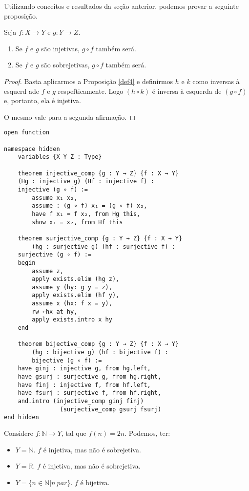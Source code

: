 Utilizando conceitos e resultados da seção anterior, podemos provar a seguinte proposição.

\begin{theorem}
    Seja $f: X \to Y$ e $g: Y \to Z$.
    \renewcommand{\labelenumi}{\Roman{enumi}}
    \begin{enumerate}
        \item Se $f$ e $g$ são injetivas, $g \circ f$ também será.
        \item Se $f$ e $g$ são sobrejetivas, $g \circ f$ também será.
    \end{enumerate}
\end{theorem}

\begin{proof}
    Basta aplicarmos a Proposição \ref{def4} e definirmos $h$ e $k$ como
    inversas à esquerd ade $f$ e $g$ respefticamente. Logo $(h \circ k)$
    é inversa à esquerda de  $(g \circ f)$ e, portanto, ela é injetiva.

    O mesmo vale para a segunda afirmação.
\end{proof}

\begin{lstlisting}
open function

namespace hidden
    variables {X Y Z : Type}

    theorem injective_comp {g : Y → Z} {f : X → Y}
    (Hg : injective g) (Hf : injective f) :
    injective (g ∘ f) :=
        assume x₁ x₂,
        assume : (g ∘ f) x₁ = (g ∘ f) x₂,
        have f x₁ = f x₂, from Hg this,
        show x₁ = x₂, from Hf this

    theorem surjective_comp {g : Y → Z} {f : X → Y}
        (hg : surjective g) (hf : surjective f) :
    surjective (g ∘ f) :=
    begin
        assume z,
        apply exists.elim (hg z),
        assume y (hy: g y = z),
        apply exists.elim (hf y),
        assume x (hx: f x = y),
        rw ←hx at hy,
        apply exists.intro x hy
    end

    theorem bijective_comp {g : Y → Z} {f : X → Y}
        (hg : bijective g) (hf : bijective f) :
        bijective (g ∘ f) :=
    have ginj : injective g, from hg.left,
    have gsurj : surjective g, from hg.right,
    have finj : injective f, from hf.left,
    have fsurj : surjective f, from hf.right,
    and.intro (injective_comp ginj finj)
                (surjective_comp gsurj fsurj)
end hidden
\end{lstlisting}

\begin{example}
    Considere $f: \mathbb{N} \to Y$, tal que $f(n) = 2n$. Podemos, ter:
    \begin{itemize}
        \item $Y = \mathbb{N}$. $f$ é injetiva, mas não é sobrejetiva.
        \item $Y = \mathbb{R}$. $f$ é injetiva, mas não é sobrejetiva.
        \item $Y = \{n \in \mathbb{N} | n~par\}$. $f$ é bijetiva.
    \end{itemize}
\end{example}